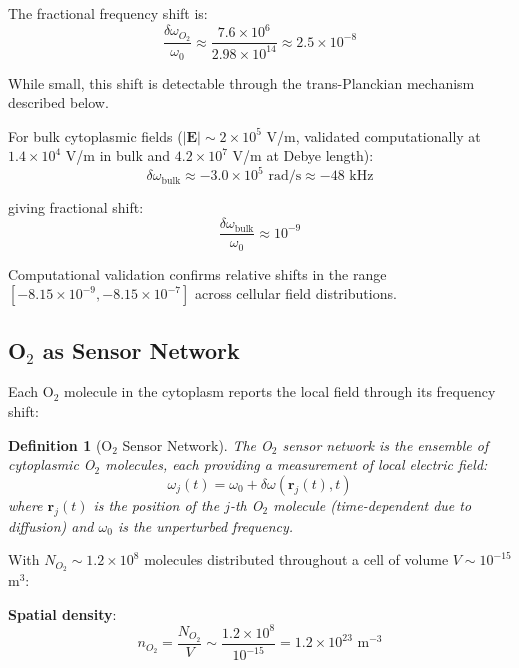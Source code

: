 \documentclass[twocolumn,10pt,aps,prd,superscriptaddress,floatfix,nofootinbib]{revtex4-2}
\newtheorem{definition}[theorem]{Definition}
\theoremstyle{remark}
\begin{document}
The fractional frequency shift is:
\begin{equation}
\frac{\delta\omega_{O_2}}{\omega_0} \approx \frac{7.6 \times 10^{6}}{2.98 \times 10^{14}} \approx 2.5 \times 10^{-8}
\end{equation}

While small, this shift is detectable through the trans-Planckian mechanism described below.

For bulk cytoplasmic fields ($|\mathbf{E}| \sim 2 \times 10^{5}$ V/m, validated computationally at $1.4 \times 10^4$ V/m in bulk and $4.2 \times 10^7$ V/m at Debye length):
\begin{equation}
\delta\omega_{\mathrm{bulk}} \approx -3.0 \times 10^{5} \text{ rad/s} \approx -48 \text{ kHz}
\end{equation}

giving fractional shift:
\begin{equation}
\frac{\delta\omega_{\mathrm{bulk}}}{\omega_0} \approx 10^{-9}
\end{equation}

Computational validation confirms relative shifts in the range $[-8.15 \times 10^{-9}, -8.15 \times 10^{-7}]$ across cellular field distributions.

\subsection{O$_2$ as Sensor Network}

Each O$_2$ molecule in the cytoplasm reports the local field through its frequency shift:

\begin{definition}[O$_2$ Sensor Network]
\label{def:O2_network}
The O$_2$ sensor network is the ensemble of cytoplasmic O$_2$ molecules, each providing a measurement of local electric field:
\begin{equation}
\omega_j(t) = \omega_0 + \delta\omega(\mathbf{r}_j(t), t)
\end{equation}
where $\mathbf{r}_j(t)$ is the position of the $j$-th O$_2$ molecule (time-dependent due to diffusion) and $\omega_0$ is the unperturbed frequency.
\end{definition}

With $N_{O_2} \sim 1.2 \times 10^{8}$ molecules distributed throughout a cell of volume $V \sim 10^{-15}$ m$^3$:

\textbf{Spatial density}: 
\begin{equation}
n_{O_2} = \frac{N_{O_2}}{V} \sim \frac{1.2 \times 10^{8}}{10^{-15}} = 1.2 \times 10^{23} \text{ m}^{-3}
\end{equation}
\end{document}

